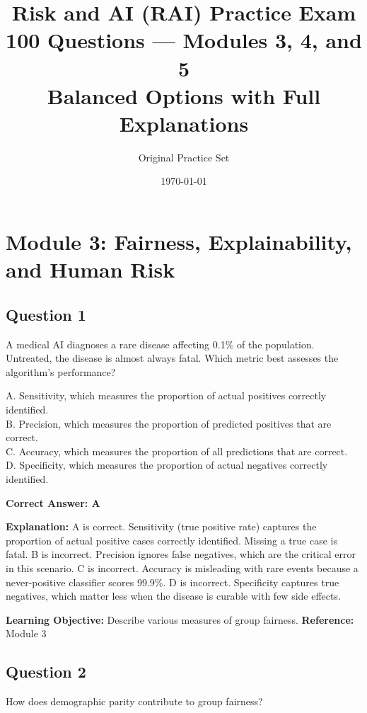 \documentclass[11pt]{article}
\title{\textbf{Risk and AI (RAI) Practice Exam}\\
	\large 100 Questions — Modules 3, 4, and 5\\
	\normalsize Balanced Options with Full Explanations}
\author{Original Practice Set}
\date{\today}
\begin{document}
	\maketitle
	

	
	\newpage
	\section{Module 3: Fairness, Explainability, and Human Risk}
	
	\subsection*{Question 1}
	A medical AI diagnoses a rare disease affecting 0.1\% of the population.
	Untreated, the disease is almost always fatal. Which metric best assesses
	the algorithm's performance?
	
	A. Sensitivity, which measures the proportion of actual positives correctly identified.\\
	B. Precision, which measures the proportion of predicted positives that are correct.\\
	C. Accuracy, which measures the proportion of all predictions that are correct.\\
	D. Specificity, which measures the proportion of actual negatives correctly identified.
	
	\vspace{0.4em}
	\textbf{Correct Answer: A}
	
	\textbf{Explanation:}
	A is correct. Sensitivity (true positive rate) captures the proportion of
	actual positive cases correctly identified. Missing a true case is fatal.
	B is incorrect. Precision ignores false negatives, which are the critical
	error in this scenario.
	C is incorrect. Accuracy is misleading with rare events because a
	never-positive classifier scores 99.9\%.
	D is incorrect. Specificity captures true negatives, which matter less
	when the disease is curable with few side effects.
	
	\textbf{Learning Objective:} Describe various measures of group fairness.
	\textbf{Reference:} Module 3
	
	\subsection*{Question 2}
	How does demographic parity contribute to group fairness?
	
\end{document}
